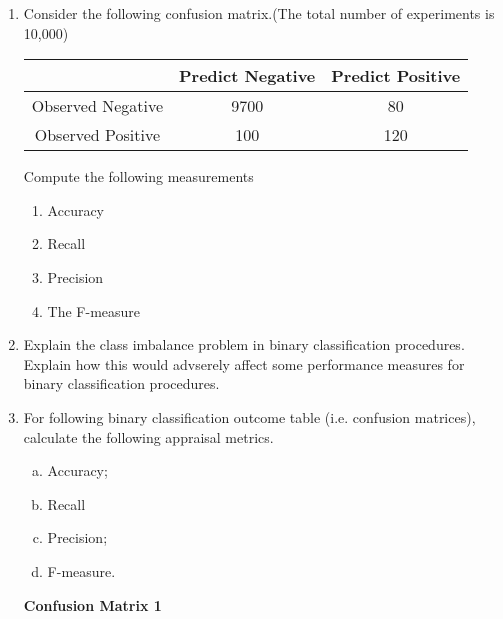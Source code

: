 \documentclass[a4paper,12pt]{article}
\begin{document}
\begin{enumerate}

\item %
Consider the following confusion matrix.(The total number of experiments is 10,000)
\begin{center}
	\begin{tabular}{|c|c|c|}
		\hline 
		& 	Predict Negative & Predict Positive \\ 
		\hline 
		Observed Negative	& 9700 & 80 \\ 
		\hline 
		Observed Positive	& 100  &  120 \\ 
		\hline 
	\end{tabular} 
\end{center}
Compute the following measurements
\begin{multicols}{2}
	\begin{enumerate}
		\item Accuracy \item Recall \item Precision \item The F-measure
	\end{enumerate}
\end{multicols}
\item Explain the class imbalance problem in binary 
classification procedures. Explain how this would advserely affect some
performance measures for binary classification procedures.
\item %
For following binary classification outcome table (i.e. confusion matrices), calculate the following appraisal metrics.

\begin{multicols}{2}
	\begin{enumerate}[(a)]
		\item Accuracy;
		\item Recall
		\item Precision;
		\item F-measure.
	\end{enumerate}
\end{multicols}
\noindent \textbf{Confusion Matrix 1} \smallskip
\begin{center}
	

\end{center}
\end{enumerate}
\end{document}
